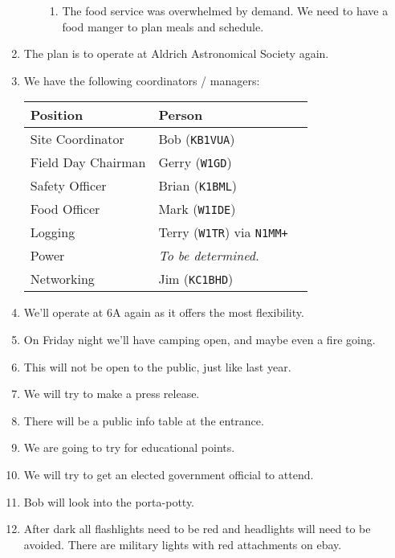 \documentclass[10pt,letterpaper]{article}
\begin{document}
\begin{enumerate}
\begin{enumerate}
\begin{enumerate}
      \item The food service was overwhelmed by demand. We need to have a food manger to plan meals and schedule.
    \end{enumerate}
  \end{enumerate}
    \item The plan is to operate at Aldrich Astronomical Society again.
    \item We have the following coordinators / managers:\\
    \begin{tabular}{|l|l|l|}
    \hline
    \textbf{Position} & \textbf{Person} \\ \hline
    Site Coordinator & Bob (\texttt{KB1VUA}) \\ \hline
    Field Day Chairman & Gerry (\texttt{W1GD}) \\ \hline
    Safety Officer & Brian (\texttt{K1BML}) \\ \hline
    Food Officer & Mark (\texttt{W1IDE}) \\ \hline
    Logging & Terry (\texttt{W1TR}) via \texttt{N1MM+} \\ \hline
    Power & \emph{To be determined.} \\ \hline
    Networking & Jim (\texttt{KC1BHD}) \\ \hline
    \end{tabular}
    \item We'll operate at 6A again as it offers the most flexibility.
    \item On Friday night we'll have camping open, and maybe even a fire going.
    \item This will not be open to the public, just like last year.
    \item We will try to make a press release.
    \item There will be a public info table at the entrance.
    \item We are going to try for educational points.
    \item We will try to get an elected government official to attend.
    \item Bob will look into the porta-potty.
    \item After dark all flashlights need to be red and headlights will need to be avoided. There are military lights with red attachments on ebay.
\end{enumerate}
\end{document}

